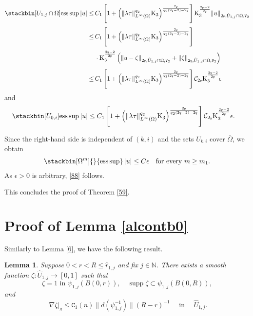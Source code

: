 \documentclass[reqno, 11pt, a4paper]{amsart}
\newtheorem{lemma}[theorem]{Lemma}
\numberwithin{equation}{section}
\newcommand{\iwe}{ \tau}
\newcommand{\xv}{2_{\mathtt{V}}}
\newcommand{\ck}{\textnormal K}
\newcommand{\spt}{\operatorname{supp}}
\newcommand{\wghtv}{\mathtt{V}}
\newcommand{\qxp}{q}
\newcommand{\cen}{\mathtt{C}}
\newcommand{\bnorm}{\boldsymbol{\|}}
\begin{document}
\begin{align*}
 \stackbin[ U _{1,j} \cap \Omega ]{}{\operatorname{ess}\sup}  \,  |u| 
   \leq  & \displaystyle \, C_1 \left[  1+  \left(\|\lambda \iwe\|_{L^\infty (\Omega)} ^{\qxp _2} \ck _3 \right) ^{ \frac{\xv}{\qxp _2 (\xv -2) - \xv}} \right] \ck _3 ^{\frac{\xv -2}{\xv}}\Vert u \Vert _{\xv , \hat U_{1,j} \cap  \Omega   , \wghtv _2}  \\[3pt]
 \leq & \displaystyle \,  C_1 \left[ 1+  \left(\|\lambda \iwe\|_{L^\infty (\Omega)} ^{\qxp _2} \ck _3 \right) ^{ \frac{\xv }{\qxp _2 (\xv -2) - \xv}}    \right] \\[3pt]
& \displaystyle \, \cdot  \ck _3 ^{\frac{\xv -2}{\xv}} \left( \Vert u - \zeta \Vert _{\xv ,  \hat U_ {1,j}  \cap \Omega   , \wghtv _2} + \Vert  \zeta \Vert _{\xv ,  \hat U_ {1,j}  \cap \Omega   , \wghtv _2} \right)    \\[5pt]
  \leq & \displaystyle \,  C_1 \left[ 1+  \left(\|\lambda \iwe\|_{L^\infty (\Omega)} ^{\qxp _2} \ck _3 \right) ^{ \frac{\xv }{\qxp _2 (\xv -2) - \xv}}   \right] \mathcal{C} _{\xv}\ck _3 ^{\frac{\xv -2}{\xv}}  \epsilon 
\end{align*}
and 
\begin{align*}
&\stackbin[ U_{0,i}]{}{\operatorname{ess}\sup} \, |u|   \leq  C_1 \left[1+ \left(\|\lambda\iwe\|_{L^\infty (\Omega)} ^{\qxp _2} \ck _3 \right) ^{ \frac{\xv }{\qxp _2 (\xv -2) - \xv}}   \right]\mathcal{C} _{\xv}\ck _3 ^{\frac{\xv -2}{\xv}}       \epsilon.
\end{align*}


Since the right-hand side is independent of $(k,i)$ and the sets $U_{k,i}$ cover $\overline\Omega$, we obtain
$$
\stackbin[\Omega^m]{}{\operatorname{ess}\sup}\,|u|
\leq
C\epsilon
\quad\text{for every }m\geq m_1.
$$
As $\epsilon>0$ is arbitrary, \eqref{88} follows.

This concludes the proof of Theorem \ref{59}.


\appendix

\section{Proof of Lemma \ref{alcontb0}}
 Similarly to Lemma \ref{6}, we have the following result.
\begin{lemma} \label{44}
Suppose $0<r<R\leq \hat r _{1,j}$ and fix $j\in \mathbb{N}$. There exists a smooth function $\zeta  : \hat U  _{1,j} \rightarrow [0,1]$ such that  
$$
\zeta  = 1 \text {  in } \psi _{1,j} (B(0,r)),   \quad \spt \zeta  \subset \psi _{1,j} (B(0,R)),
$$
 and 
 $$
 |\nabla \zeta  | _g \leq \cen _1(n)\bnorm d (\psi _{1,j}^{-1}) \bnorm  (R-r)^{-1} \quad \text { in } \quad \hat  U _{1,j}.
 $$ 
\end{lemma}
 
\end{document}
